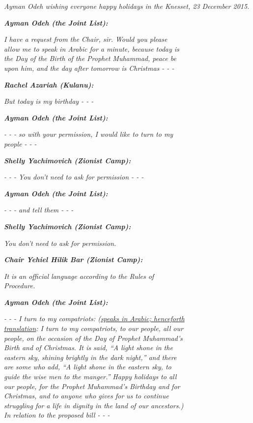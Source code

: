 \documentclass[output=paper,arabicfont]{langscibook}
\begin{document}
\setlength\linenumbersep{-.5cm}
\begin{exe}\ex\label{hawker:ex1}
\textit{Ayman Odeh wishing everyone happy holidays in the Knesset, 23 December 2015.}\\

\exi{}
\begin{linenumbers*}
\textbf{\textit{Ayman Odeh (the Joint List):}} 

\textit{I have a request from the Chair, sir. Would you please\\ allow me to speak in Arabic for a minute, because today is\\ the Day of the Birth of the Prophet Muhammad, peace be\\ upon him, and the day after tomorrow is Christmas - - -}

\textbf{\textit{Rachel Azariah (Kulanu):}}

\textit{But today is my birthday - - -}

\textbf{\textit{Ayman Odeh (the Joint List):}}

\textit{- - - so with your permission, I would like to turn to my\\
 people - - -}

\textbf{\textit{Shelly Yachimovich (Zionist Camp):}}

\textit{- - - You don’t need to ask for permission - - -}

\textbf{\textit{Ayman Odeh (the Joint List):}}

\textit{- - - and tell them - - -}

\textbf{\textit{Shelly Yachimovich (Zionist Camp):}} 

\textit{You don’t need to ask for permission.}

\textbf{\textit{Chair Yehiel Hilik Bar (Zionist Camp):}}

\textit{It is an official language according to the Rules of\\
 Procedure.}

\textbf{\textit{Ayman Odeh (the Joint List):}}

\textit{- - - I turn to my compatriots: (\ul{speaks in Arabic; henceforth}\\
\ul{translation}: I turn to my compatriots, to our people, all our \\
people, on the occasion of the Day of Prophet Muhammad’s \\
Birth and of Christmas. It is said, “A light shone in the \\
eastern sky, shining brightly in the dark night,” and there \\
are some who add, “A light shone in the eastern sky, to \\
guide the wise men to the manger.” Happy holidays to all \\
our people, for the Prophet Muhammad’s Birthday and for \\
Christmas, and to anyone who gives for us to continue \\
struggling for a life in dignity in the land of our ancestors.) \\
In relation to the proposed bill - - -}


\end{linenumbers*}
\end{exe}
\end{document}
